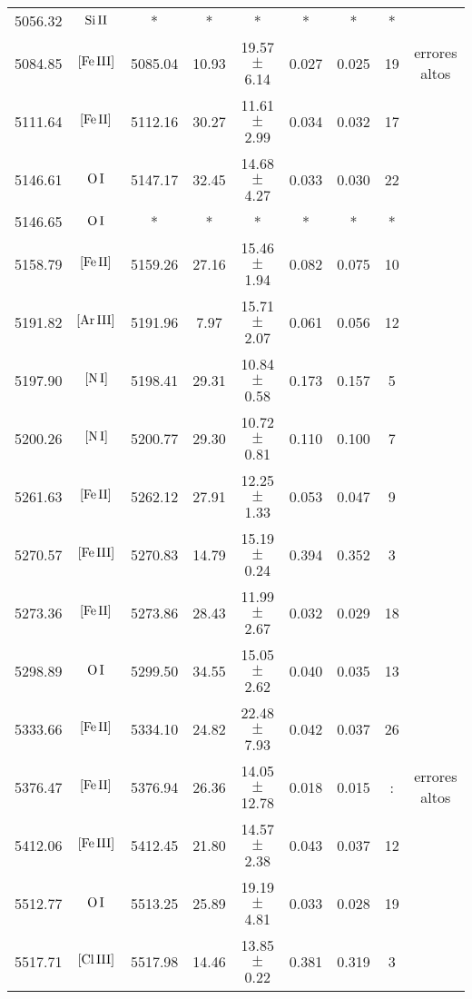 \documentclass{article}
\begin{document}
\begin{table*}
\begin{adjustbox}{width=\textwidth}
\begin{tabular}{ccccccccc}
5056.32 & $\mbox{Si}\thinspace \mbox{II}$ & * & * & * & * & * & * &  \\
5084.85 & $\mbox{[Fe}\thinspace \mbox{III]}$ & 5085.04 & 10.93 & 19.57 $\pm$ 6.14 & 0.027 & 0.025 & 19 &  errores altos \\
5111.64 & $\mbox{[Fe}\thinspace \mbox{II]}$ & 5112.16 & 30.27 & 11.61 $\pm$ 2.99 & 0.034 & 0.032 & 17 &  \\
5146.61 & $\mbox{O}\thinspace \mbox{I}$ & 5147.17 & 32.45 & 14.68 $\pm$ 4.27 & 0.033 & 0.030 & 22 &  \\
5146.65 & $\mbox{O}\thinspace \mbox{I}$ & * & * & * & * & * & * &  \\
5158.79 & $\mbox{[Fe}\thinspace \mbox{II]}$ & 5159.26 & 27.16 & 15.46 $\pm$ 1.94 & 0.082 & 0.075 & 10 &  \\
5191.82 & $\mbox{[Ar}\thinspace \mbox{III]}$ & 5191.96 & 7.97 & 15.71 $\pm$ 2.07 & 0.061 & 0.056 & 12 &  \\
5197.90 & $\mbox{[N}\thinspace \mbox{I]}$ & 5198.41 & 29.31 & 10.84 $\pm$ 0.58 & 0.173 & 0.157 & 5 &  \\
5200.26 & $\mbox{[N}\thinspace \mbox{I]}$ & 5200.77 & 29.30 & 10.72 $\pm$ 0.81 & 0.110 & 0.100 & 7 &  \\
5261.63 & $\mbox{[Fe}\thinspace \mbox{II]}$ & 5262.12 & 27.91 & 12.25 $\pm$ 1.33 & 0.053 & 0.047 & 9 &  \\
5270.57 & $\mbox{[Fe}\thinspace \mbox{III]}$ & 5270.83 & 14.79 & 15.19 $\pm$ 0.24 & 0.394 & 0.352 & 3 &  \\
5273.36 & $\mbox{[Fe}\thinspace \mbox{II]}$ & 5273.86 & 28.43 & 11.99 $\pm$ 2.67 & 0.032 & 0.029 & 18 &  \\
5298.89 & $\mbox{O}\thinspace \mbox{I}$ & 5299.50 & 34.55 & 15.05 $\pm$ 2.62 & 0.040 & 0.035 & 13 &  \\
5333.66 & $\mbox{[Fe}\thinspace \mbox{II]}$ & 5334.10 & 24.82 & 22.48 $\pm$ 7.93 & 0.042 & 0.037 & 26 &  \\
5376.47 & $\mbox{[Fe}\thinspace \mbox{II]}$ & 5376.94 & 26.36 & 14.05 $\pm$ 12.78 & 0.018 & 0.015 & : &  errores altos \\
5412.06 & $\mbox{[Fe}\thinspace \mbox{III]}$ & 5412.45 & 21.80 & 14.57 $\pm$ 2.38 & 0.043 & 0.037 & 12 &  \\
5512.77 & $\mbox{O}\thinspace \mbox{I}$ & 5513.25 & 25.89 & 19.19 $\pm$ 4.81 & 0.033 & 0.028 & 19 &  \\
5517.71 & $\mbox{[Cl}\thinspace \mbox{III]}$ & 5517.98 & 14.46 & 13.85 $\pm$ 0.22 & 0.381 & 0.319 & 3 &  \\

\end{tabular}
\end{adjustbox}
\end{table*}
\end{document}
